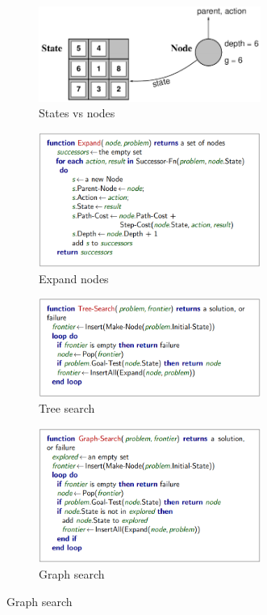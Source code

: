 \documentclass[11pt,oneside]{book}
\begin{document}
\begin{figure}[htp]
	\begin{subfigure}{0.49\textwidth}
	    \centering
		\includegraphics[width=0.8\textwidth]{states-nodes.png} 
		\caption{States vs nodes}
	\end{subfigure}
	\hfill
	\begin{subfigure}{0.49\textwidth}
	    \centering
		\includegraphics[width=0.8\textwidth]{expand.png} 
		\caption{Expand nodes}
	\end{subfigure}
	\begin{subfigure}{0.49\textwidth}
	    \centering
		\includegraphics[width=0.8\textwidth]{tree-search.png}
		\caption{Tree search}
	\end{subfigure}
	\hfill
	\begin{subfigure}{0.49\textwidth}
	    \centering
		\includegraphics[width=0.8\textwidth]{graph-search.png}
		\caption{Graph search}
	\end{subfigure}
\end{figure}
\end{document}
